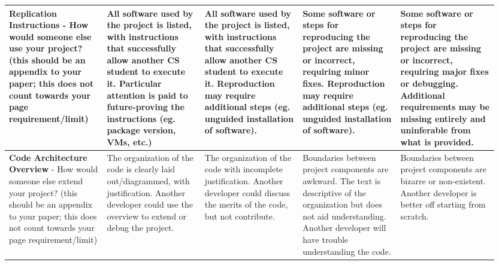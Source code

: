 \documentclass[10pt,twocolumn]{article}
\begin{document}
\begin{landscape}
\begin{longtable}{p{0.19\linewidth} | p{0.19\linewidth} | p{0.19\linewidth} | p{0.19\linewidth} | p{0.19\linewidth}}
\midrule
\textbf{Replication Instructions} - How would someone else use your project? (this should be an appendix to your paper; this does not count towards your page requirement/limit)
    & \cellcolor{excellent} All software used by the project is listed, with instructions that successfully allow another CS student to execute it. Particular attention is paid to future-proving the instructions (eg. package version, VMs, etc.)
    & \cellcolor{good} All software used by the project is listed, with instructions that successfully allow another CS student to execute it. Reproduction may require additional steps (eg. unguided installation of software).
    & \cellcolor{marginal} Some software or steps for reproducing the project are missing or incorrect, requiring minor fixes. Reproduction may require additional steps (eg. unguided installation of software).
    & \cellcolor{unacceptable} Some software or steps for reproducing the project are missing or incorrect, requiring major fixes or debugging. Additional requirements may be missing entirely and uninferable from what is provided. \\
\midrule
\textbf{Code Architecture Overview} - How would someone else extend your project? (this should be an appendix to your paper; this does not count towards your page requirement/limit)
    & \cellcolor{excellent} The organization of the code is clearly laid out/diagrammed, with justification. Another developer could use the overview to extend or debug the project.
    & \cellcolor{good} The organization of the code with incomplete justification. Another developer could discuss the merits of the code, but not contribute.
    & \cellcolor{marginal} Boundaries between project components are awkward. The text is descriptive of the organization but does not aid understanding. Another developer will have trouble understanding the code.
    & \cellcolor{unacceptable} Boundaries between project components are bizarre or non-existent. Another developer is better off starting from scratch. \\
\end{longtable}
\end{landscape}
\end{document}
